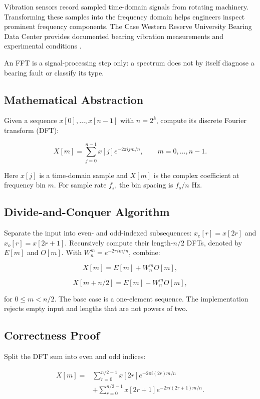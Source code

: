 \documentclass[conference]{IEEEtran}
\begin{document}
Vibration sensors record sampled time-domain signals from rotating
machinery. Transforming these samples into the frequency domain helps
engineers inspect prominent frequency components. The Case Western
Reserve University Bearing Data Center provides documented bearing
vibration measurements and experimental conditions \cite{cwru}.

An FFT is a signal-processing step only: a spectrum does not by itself
diagnose a bearing fault or classify its type.

\subsection{Mathematical Abstraction}

Given a sequence $x[0],\ldots,x[n-1]$ with $n=2^k$, compute its
discrete Fourier transform (DFT):

\[
X[m]=\sum_{j=0}^{n-1}x[j]e^{-2\pi i jm/n},
\qquad m=0,\ldots,n-1.
\]

Here $x[j]$ is a time-domain sample and $X[m]$ is the complex
coefficient at frequency bin $m$. For sample rate $f_s$, the bin
spacing is $f_s/n$ Hz.

\subsection{Divide-and-Conquer Algorithm}

Separate the input into even- and odd-indexed subsequences:
$x_e[r]=x[2r]$ and $x_o[r]=x[2r+1]$. Recursively compute their
length-$n/2$ DFTs, denoted by $E[m]$ and $O[m]$. With
$W_n^m=e^{-2\pi i m/n}$, combine:

\[
X[m]=E[m]+W_n^mO[m],
\]

\[
X[m+n/2]=E[m]-W_n^mO[m],
\]

for $0\leq m<n/2$. The base case is a one-element sequence. The
implementation rejects empty input and lengths that are not powers
of two.

\subsection{Correctness Proof}

Split the DFT sum into even and odd indices:

\[
\begin{aligned}
X[m]
={}&\sum_{r=0}^{n/2-1}x[2r]e^{-2\pi i(2r)m/n}\\
&+\sum_{r=0}^{n/2-1}x[2r+1]e^{-2\pi i(2r+1)m/n}.
\end{aligned}
\]
\end{document}
